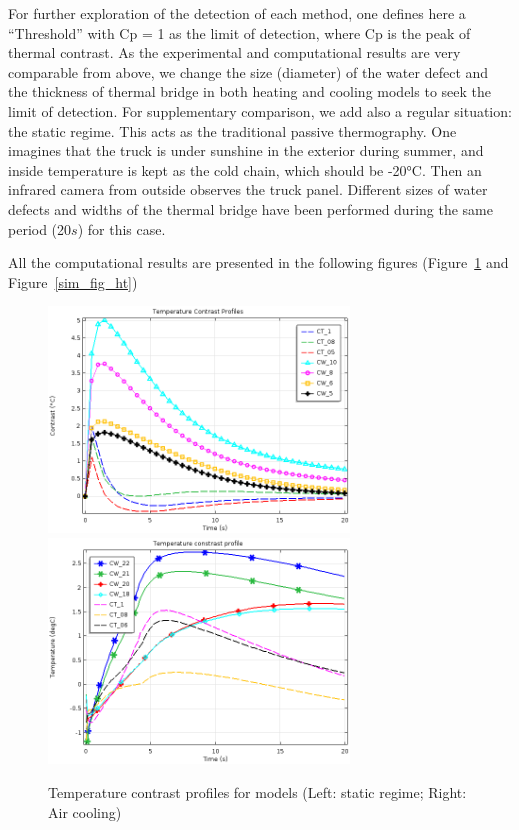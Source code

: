\documentclass{tQRT2e}
\begin{document}
For further exploration of the detection of each method, one defines here a “Threshold” with Cp = 1 as the limit of detection, where Cp is the peak of thermal contrast. As the experimental and computational results are very comparable from above, we change the size (diameter) of the water defect and the thickness of thermal bridge in both heating and cooling models to seek the limit of detection. For supplementary comparison, we add also a regular situation: the static regime. This acts as the traditional passive thermography. One imagines that the truck is under sunshine in the exterior during summer, and inside temperature is kept as the cold chain, which should be -20°C. Then an infrared camera from outside observes the truck panel. Different sizes of water defects and widths of the thermal bridge have been performed during the same period (20$ s $) for this case.

All the computational results are presented in the following figures (Figure~\ref{sim_fig_stat} and Figure~\ref{sim_fig_ht})
\begin{figure}
	\includegraphics[width=8cm, height=6cm]{Truck_panel_Model_Static_Contrast}
	\includegraphics[width=8cm, height=6cm]{Truck_panel_Model_laminar}
	\caption{Temperature contrast profiles for models (Left: static regime; Right: Air cooling)}
	\label{sim_fig_stat}
\end{figure}
\end{document}
